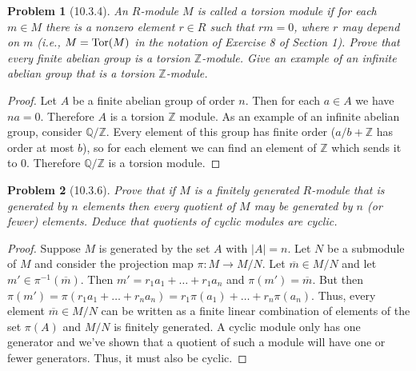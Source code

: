 \documentclass{article}
\newcommand{\tor}{\textup{Tor}}
\newtheorem{problem}{Problem}
\begin{document}
\begin{problem}[10.3.4]
An $R$-module $M$ is called a \emph{torsion} module if for each $m \in M$ there is a nonzero element $r \in R$ such that $rm = 0$, where $r$ may depend on $m$ (i.e., $M = \tor(M)$ in the notation of Exercise 8 of Section 1). Prove that every finite abelian group is a torsion $\mathbb{Z}$-module. Give an example of an infinite abelian group that is a torsion $\mathbb{Z}$-module.
\end{problem}
\begin{proof}
Let $A$ be a finite abelian group of order $n$. Then for each $a \in A$ we have $na = 0$. Therefore $A$ is a torsion $\mathbb{Z}$ module. As an example of an infinite abelian group, consider $\mathbb{Q}/\mathbb{Z}$. Every element of this group has finite order ($a/b + \mathbb{Z}$ has order at most $b$), so for each element we can find an element of $\mathbb{Z}$ which sends it to $0$. Therefore $\mathbb{Q}/\mathbb{Z}$ is a torsion module.
\end{proof}

\begin{problem}[10.3.6]
Prove that if $M$ is a finitely generated $R$-module that is generated by $n$ elements then every quotient of $M$ may be generated by $n$ (or fewer) elements. Deduce that quotients of cyclic modules are cyclic.
\end{problem}
\begin{proof}
Suppose $M$ is generated by the set $A$ with $|A| = n$. Let $N$ be a submodule of $M$ and consider the projection map $\pi : M \to M/N$. Let $\overline{m} \in M/N$ and let $m' \in \pi^{-1}(\overline{m})$. Then $m' = r_1a_1 + \dots + r_1a_n$ and $\pi(m') = \overline{m}$. But then $\pi(m') = \pi(r_1a_1 + \dots + r_na_n) = r_1\pi(a_1) + \dots + r_n\pi(a_n)$. Thus, every element $\overline{m} \in M/N$ can be written as a finite linear combination of elements of the set $\pi(A)$ and $M/N$ is finitely generated. A cyclic module only has one generator and we've shown that a quotient of such a module will have one or fewer generators. Thus, it must also be cyclic.
\end{proof}
\end{document}
